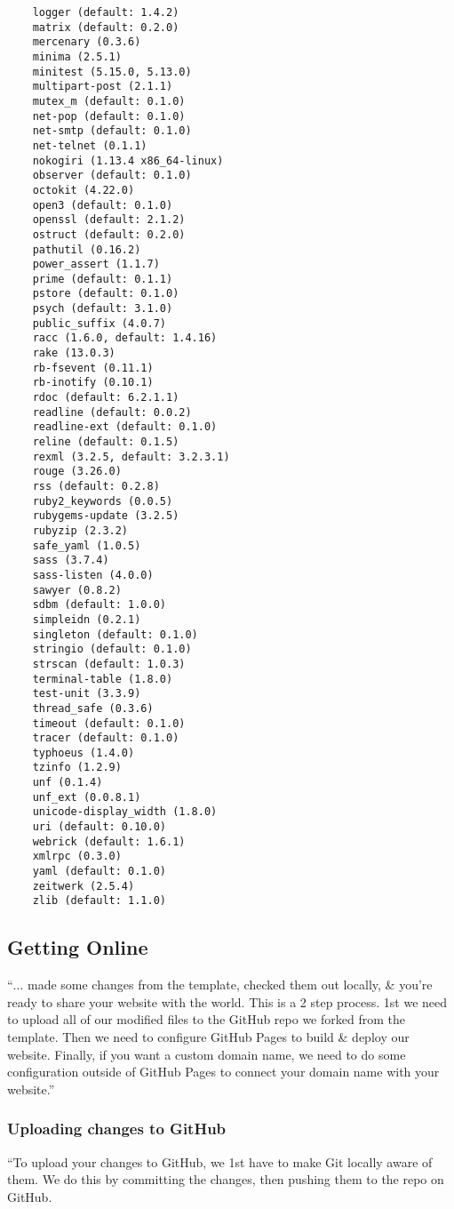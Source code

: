 \documentclass{article}
\numberwithin{equation}{section}
\begin{document}
\begin{verbatim}
	logger (default: 1.4.2)
	matrix (default: 0.2.0)
	mercenary (0.3.6)
	minima (2.5.1)
	minitest (5.15.0, 5.13.0)
	multipart-post (2.1.1)
	mutex_m (default: 0.1.0)
	net-pop (default: 0.1.0)
	net-smtp (default: 0.1.0)
	net-telnet (0.1.1)
	nokogiri (1.13.4 x86_64-linux)
	observer (default: 0.1.0)
	octokit (4.22.0)
	open3 (default: 0.1.0)
	openssl (default: 2.1.2)
	ostruct (default: 0.2.0)
	pathutil (0.16.2)
	power_assert (1.1.7)
	prime (default: 0.1.1)
	pstore (default: 0.1.0)
	psych (default: 3.1.0)
	public_suffix (4.0.7)
	racc (1.6.0, default: 1.4.16)
	rake (13.0.3)
	rb-fsevent (0.11.1)
	rb-inotify (0.10.1)
	rdoc (default: 6.2.1.1)
	readline (default: 0.0.2)
	readline-ext (default: 0.1.0)
	reline (default: 0.1.5)
	rexml (3.2.5, default: 3.2.3.1)
	rouge (3.26.0)
	rss (default: 0.2.8)
	ruby2_keywords (0.0.5)
	rubygems-update (3.2.5)
	rubyzip (2.3.2)
	safe_yaml (1.0.5)
	sass (3.7.4)
	sass-listen (4.0.0)
	sawyer (0.8.2)
	sdbm (default: 1.0.0)
	simpleidn (0.2.1)
	singleton (default: 0.1.0)
	stringio (default: 0.1.0)
	strscan (default: 1.0.3)
	terminal-table (1.8.0)
	test-unit (3.3.9)
	thread_safe (0.3.6)
	timeout (default: 0.1.0)
	tracer (default: 0.1.0)
	typhoeus (1.4.0)
	tzinfo (1.2.9)
	unf (0.1.4)
	unf_ext (0.0.8.1)
	unicode-display_width (1.8.0)
	uri (default: 0.10.0)
	webrick (default: 1.6.1)
	xmlrpc (0.3.0)
	yaml (default: 0.1.0)
	zeitwerk (2.5.4)
	zlib (default: 1.1.0)
\end{verbatim}

\subsection{Getting Online}
``$\ldots$ made some changes from the template, checked them out locally, \& you're ready to share your website with the world. This is a 2 step process. 1st we need to upload all of our modified files to the GitHub repo we forked from the template. Then we need to configure GitHub Pages to build \& deploy our website. Finally, if you want a custom domain name, we need to do some configuration outside of GitHub Pages to connect your domain name with your website.''

\subsubsection{Uploading changes to GitHub}
``To upload your changes to GitHub, we 1st have to make Git locally aware of them. We do this by committing the changes, then pushing them to the repo on GitHub.
\end{document}
